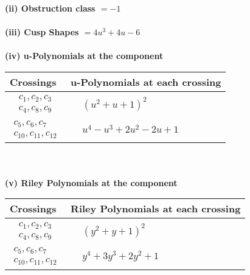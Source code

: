 \documentclass[1p]{elsarticle_modified}
\theoremstyle{definition}
\begin{document}
\flushleft \textbf{(ii) Obstruction class $= -1$}\\~\\
\flushleft \textbf{(iii) Cusp Shapes $= 4 u^3+4 u-6$}\\~\\
\newpage\renewcommand{\arraystretch}{1}
\flushleft \textbf{(iv) u-Polynomials at the component}\newline \\
\begin{tabular}{m{50pt}|m{274pt}}
Crossings & \hspace{64pt}u-Polynomials at each crossing \\
\hline $$\begin{aligned}c_{1},c_{2},c_{3}\\c_{4},c_{8},c_{9}\end{aligned}$$&$\begin{aligned}
&(u^2+u+1)^2
\end{aligned}$\\
\hline $$\begin{aligned}c_{5},c_{6},c_{7}\\c_{10},c_{11},c_{12}\end{aligned}$$&$\begin{aligned}
&u^4- u^3+2 u^2-2 u+1
\end{aligned}$\\
\hline
\end{tabular}\\~\\
\newpage\renewcommand{\arraystretch}{1}
\flushleft \textbf{(v) Riley Polynomials at the component}\newline \\
\begin{tabular}{m{50pt}|m{274pt}}
Crossings & \hspace{64pt}Riley Polynomials at each crossing \\
\hline $$\begin{aligned}c_{1},c_{2},c_{3}\\c_{4},c_{8},c_{9}\end{aligned}$$&$\begin{aligned}
&(y^2+y+1)^2
\end{aligned}$\\
\hline $$\begin{aligned}c_{5},c_{6},c_{7}\\c_{10},c_{11},c_{12}\end{aligned}$$&$\begin{aligned}
&y^4+3 y^3+2 y^2+1
\end{aligned}$\\
\hline
\end{tabular}\\~\\
\end{document}
